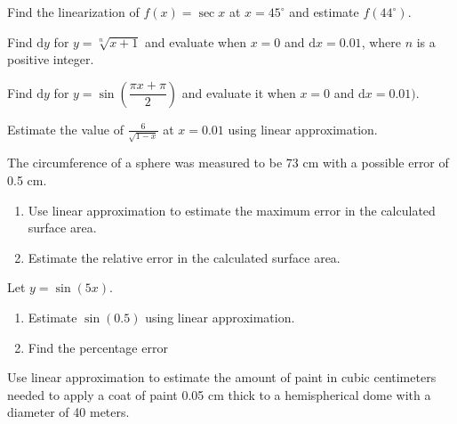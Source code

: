 \begin{exercise}

Find the linearization of \(f(x)=\sec x\) at \(x= 45^\circ\) and
estimate \(f(44^\circ)\).

\end{exercise}
\vspace*{6\baselineskip}

\begin{exercise}

Find \(\mathrm{d}y\) for \(y=\sqrt[n]{x+1}\) and evaluate when \(x=0\)
and \(\mathrm{d}x=0. 01\), where \(n\) is a positive integer.

\end{exercise}
\vspace*{6\baselineskip}

\begin{exercise}

Find \(\mathrm{d}y\) for \(y=\sin\left(\dfrac{\pi x+\pi}{2}\right)\) and
evaluate it when \(x=0\) and \(\mathrm{d}x =0.01)\).

\end{exercise}
\vspace*{6\baselineskip}

\begin{exercise}

Estimate the value of \(\displaystyle \frac{6}{\sqrt{1-x}}\) at
\(x=0.01\) using linear approximation.

\end{exercise}
\vspace*{6\baselineskip}

\begin{exercise}

The circumference of a sphere was measured to be 73 cm with a possible
error of 0.5 cm.

\begin{enumerate}
\item
  Use linear approximation to estimate the maximum error in the
  calculated surface area.
\item
  Estimate the relative error in the calculated surface area.
\end{enumerate}

\end{exercise}

\begin{exercise}

Let \(y=\sin(5x)\).

\begin{enumerate}
\item
  Estimate \(\sin(0.5)\) using linear approximation.
\item
  Find the percentage error
\end{enumerate}

\end{exercise}

\begin{exercise}

Use linear approximation to estimate the amount of paint in cubic
centimeters needed to apply a coat of paint 0.05 cm thick to a
hemispherical dome with a diameter of 40 meters.

\end{exercise}

